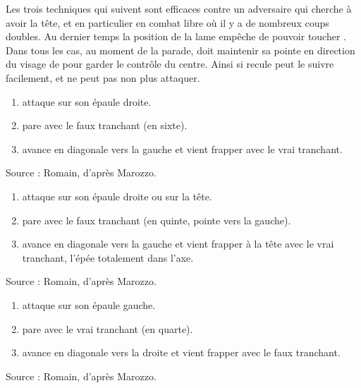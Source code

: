 Les trois techniques qui suivent sont efficaces contre un adversaire qui cherche à avoir la tête, et en particulier en combat libre où il y a de nombreux coups doubles.
Au dernier temps la position de la lame empêche \A de pouvoir toucher \D.
Dans tous les cas, au moment de la parade, \D doit maintenir sa pointe en direction du visage de \A pour garder le contrôle du centre.
Ainsi si \A recule \D peut le suivre facilement, et \A ne peut pas non plus attaquer.


\begin{technique}
\label{épée-longue:italien:fiore:tech:faux-tranchant-droite}

\begin{enumerate}
	\item \A attaque \D sur son épaule droite.
	
	\item \D pare avec le faux tranchant (en sixte).
	
	\item \D avance en diagonale vers la gauche et vient frapper \A avec le vrai tranchant.
\end{enumerate}

Source : Romain, d'après Marozzo.

\end{technique}


\begin{technique}

\begin{enumerate}
	\item \A attaque \D sur son épaule droite ou sur la tête.
	
	\item \D pare avec le faux tranchant (en quinte, pointe vers la gauche).
	
	\item \D avance en diagonale vers la gauche et vient frapper \A à la tête avec le vrai tranchant, l'épée totalement dans l'axe.
\end{enumerate}

Source : Romain, d'après Marozzo.

\end{technique}


\begin{technique}

\begin{enumerate}
	\item \A attaque \D sur son épaule gauche.
	
	\item \D pare avec le vrai tranchant (en quarte).
	
	\item \D avance en diagonale vers la droite et vient frapper \A avec le faux tranchant.
\end{enumerate}

Source : Romain, d'après Marozzo.

\end{technique}


